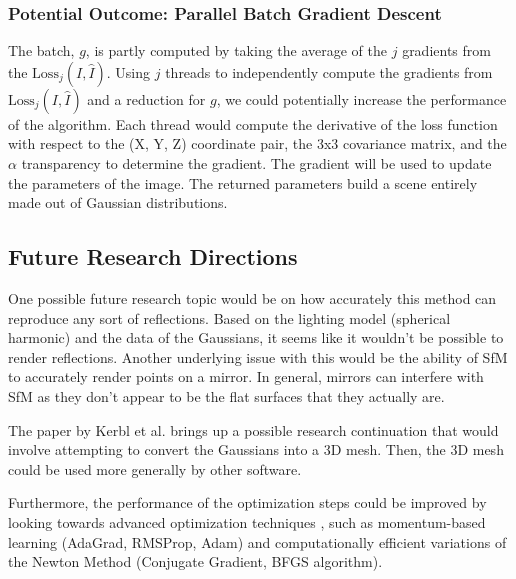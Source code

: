 \documentclass[12pt, a4paper, twocolumn]{article}
\begin{document}
\subsubsection{Potential Outcome: Parallel Batch Gradient Descent}

The batch, $g$, is partly computed by taking the average of the $j$ gradients from the $\text{Loss}_j(I, \hat{I})$. Using $j$ threads to independently compute the gradients from $\text{Loss}_j(I, \hat{I})$ and a reduction for $g$, we could potentially increase the performance of the algorithm. Each thread would compute the derivative of the loss function with respect to the (X, Y, Z) coordinate pair, the 3x3 covariance matrix, and the $\alpha$ transparency to determine the gradient. The gradient will be used to update the parameters of the image. The returned parameters build a scene entirely made out of Gaussian distributions.

\subsection{Future Research Directions}
One possible future research topic would be on how accurately this method can reproduce
any sort of reflections. Based on the lighting model (spherical harmonic) and the data of the Gaussians,
it seems like it wouldn't be possible to render reflections. 
Another underlying issue with this would be the ability of SfM to accurately render points on a mirror.
In general, mirrors can interfere with SfM as they don't appear to be the flat surfaces that they actually are.

The paper by Kerbl et al. \cite{kerbl20233d} brings up a possible research continuation that would involve attempting to convert the Gaussians into a 3D mesh.
Then, the 3D mesh could be used more generally by other software.

Furthermore, the performance of the optimization steps could be improved by looking towards advanced optimization techniques \cite{Mustapha_2021}, such as momentum-based learning (AdaGrad, RMSProp, Adam) and computationally efficient variations of the Newton Method (Conjugate Gradient, BFGS algorithm).






\nocite{*}


\end{document}
